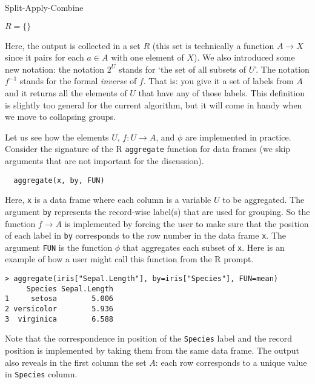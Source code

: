 \documentclass[11pt, fleqn]{article}
\begin{document}
\begin{algorithm}[H]
\caption{Split-Apply-Combine}
\label{alg:sac}

$R = \{\}$\;
\end{algorithm}
Here, the output is collected in a set $R$ (this set is technically a function
$A\to X$ since it pairs for each $a\in A$ with one element of $X$). We also
introduced some new notation: the notation $2^U$ stands for `the set of all
subsets of $U$'. The notation $f^{-1}$ stands for the formal \emph{inverse} of
$f$. That is: you give it a set of labels from $A$ and it returns all the
elements of $U$ that have any of those labels. This definition is slightly too
general for the current algorithm, but it will come in handy when we move to
collapsing groups.

Let us see how the elements $U$, $f:U\to A$, and $\phi$ are implemented
in practice. Consider the signature of the R \texttt{aggregate} function for data
frames (we skip arguments that are not important for the discussion).
\begin{verbatim}
  aggregate(x, by, FUN)
\end{verbatim}
Here, \texttt{x} is a data frame where each column is a variable $U$ to be
aggregated.  The argument \texttt{by} represents the record-wise label(s) that
are used for grouping. So the function $f\to A$ is implemented by forcing the
user to make sure that the position of each label in \texttt{by} corresponds to
the row number in the data frame \texttt{x}. The argument \texttt{FUN} is the
function $\phi$ that aggregates each subset of \texttt{x}.  Here is an example of how
a user might call this function from the R prompt.
%
\begin{verbatim}
> aggregate(iris["Sepal.Length"], by=iris["Species"], FUN=mean)
     Species Sepal.Length
1     setosa        5.006
2 versicolor        5.936
3  virginica        6.588
\end{verbatim}
%
Note that the correspondence in position of the \texttt{Species} label and the
record position is implemented by taking them from the same data frame. The output
also reveals in the first column the set $A$: each row corresponds to a unique
value in \texttt{Species} column.
\end{document}

